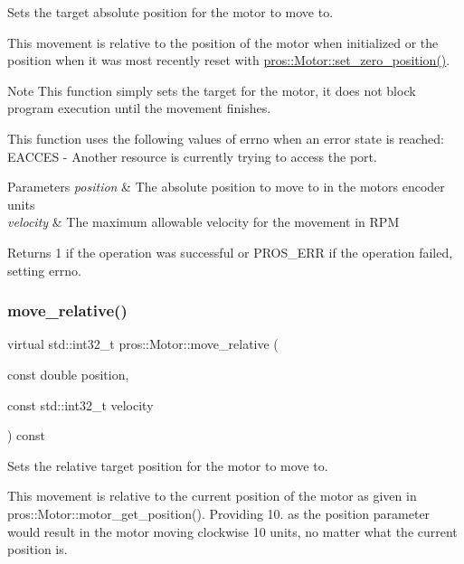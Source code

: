 Sets the target absolute position for the motor to move to. 

This movement is relative to the position of the motor when initialized or the position when it was most recently reset with \mbox{\hyperlink{classpros_1_1Motor_af20c036c1d5d68eb5e762c12f9a4b7fe}{pros\+::\+Motor\+::set\+\_\+zero\+\_\+position()}}.

\begin{DoxyNote}{Note}
This function simply sets the target for the motor, it does not block program execution until the movement finishes.
\end{DoxyNote}
This function uses the following values of errno when an error state is reached\+: E\+A\+C\+C\+ES -\/ Another resource is currently trying to access the port.


\begin{DoxyParams}{Parameters}
{\em position} & The absolute position to move to in the motor\textquotesingle{}s encoder units \\
\hline
{\em velocity} & The maximum allowable velocity for the movement in R\+PM\\
\hline
\end{DoxyParams}
\begin{DoxyReturn}{Returns}
1 if the operation was successful or P\+R\+O\+S\+\_\+\+E\+RR if the operation failed, setting errno. 
\end{DoxyReturn}
\mbox{\label{classpros_1_1Motor_a96c09e169b5135d9001cec92fa2686c1}} 
\subsubsection{\texorpdfstring{move\_relative()}{move\_relative()}}
{\footnotesize\ttfamily virtual std\+::int32\+\_\+t pros\+::\+Motor\+::move\+\_\+relative (\begin{DoxyParamCaption}\item[{const double}]{position,  }\item[{const std\+::int32\+\_\+t}]{velocity }\end{DoxyParamCaption}) const\hspace{0.3cm}{\ttfamily [virtual]}}



Sets the relative target position for the motor to move to. 

This movement is relative to the current position of the motor as given in pros\+::\+Motor\+::motor\+\_\+get\+\_\+position(). Providing 10. as the position parameter would result in the motor moving clockwise 10 units, no matter what the current position is.

